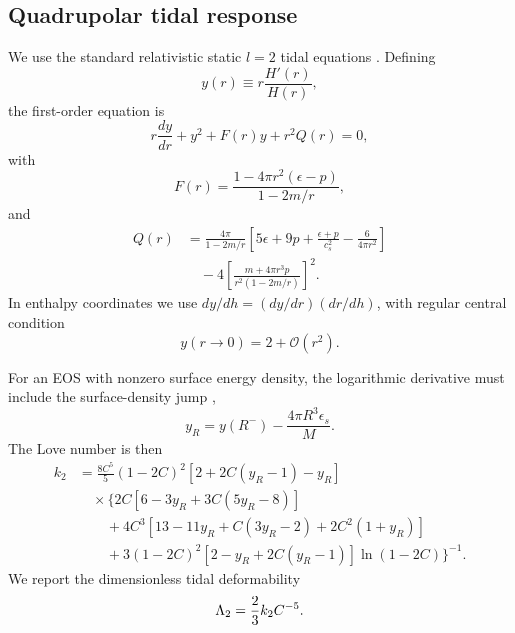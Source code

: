 \subsection{Quadrupolar tidal response}

We use the standard relativistic static \(l=2\) tidal equations
\cite{hinderer2008love,postnikov2010love}.  Defining
\begin{equation}
    y(r)\equiv r\frac{H'(r)}{H(r)},
\end{equation}
the first-order equation is
\begin{equation}
    r\frac{dy}{dr}
    +
    y^2+F(r)y+r^2Q(r)=0,
    \label{eq:y-tidal}
\end{equation}
with
\begin{equation}
    F(r)
    =
    \frac{1-4\pi r^2(\epsilon-p)}
    {1-2m/r},
\end{equation}
and
\begin{align}
    Q(r)
    &=
    \frac{4\pi}
    {1-2m/r}
    \left[
        5\epsilon+9p+\frac{\epsilon+p}{c_s^2}
        -\frac{6}{4\pi r^2}
    \right]
    \nonumber\\
    &\quad
    -
    4
    \left[
        \frac{m+4\pi r^3p}
        {r^2(1-2m/r)}
    \right]^2.
    \label{eq:Q-tidal}
\end{align}
In enthalpy coordinates we use \(dy/dh=(dy/dr)(dr/dh)\), with regular
central condition
\begin{equation}
    y(r\rightarrow0)=2+\mathcal O(r^2).
\end{equation}

For an EOS with nonzero surface energy density, the logarithmic derivative
must include the surface-density jump \cite{postnikov2010love},
\begin{equation}
    y_R
    =
    y(R^-)
    -
    \frac{4\pi R^3\epsilon_s}{M}.
    \label{eq:y-surface}
\end{equation}
The Love number is then
\begin{align}
k_2
&=
\frac{8C^5}{5}(1-2C)^2
\left[2+2C(y_R-1)-y_R\right]
\nonumber\\
&\quad\times
\Big\{
2C[6-3y_R+3C(5y_R-8)]
\nonumber\\
&\qquad
+4C^3[13-11y_R+C(3y_R-2)+2C^2(1+y_R)]
\nonumber\\
&\qquad
+3(1-2C)^2
[2-y_R+2C(y_R-1)]
\ln(1-2C)
\Big\}^{-1}.
\label{eq:k2}
\end{align}
We report the dimensionless tidal deformability
\begin{equation}
    \Lambda_2=\frac{2}{3}k_2C^{-5}.
    \label{eq:lambda}
\end{equation}

